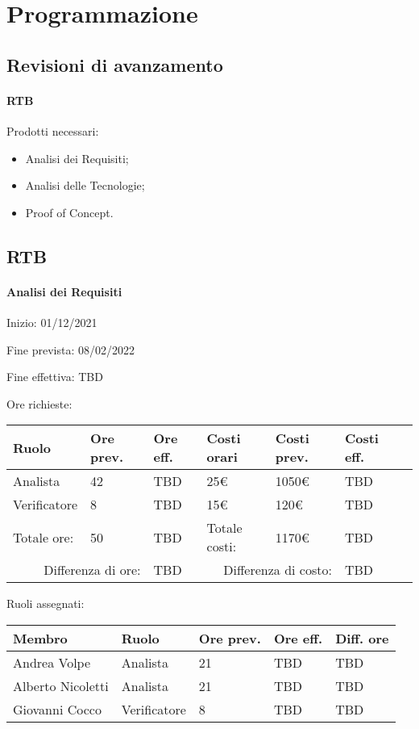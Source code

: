 \documentclass[a4paper, 12pt]{article}
\begin{document}
\makefrontpage

\makeversioni

\section{Programmazione}
\subsection{Revisioni di avanzamento}
\paragraph{RTB}
Prodotti necessari:
\begin{itemize}
\item Analisi dei Requisiti;
\item Analisi delle Tecnologie;
\item Proof of Concept.
\end{itemize}


\subsection{RTB}
\paragraph{Analisi dei Requisiti}
Inizio: 01/12/2021\par
Fine prevista: 08/02/2022\par
Fine effettiva: TBD

Ore richieste:\\[0.5em]
\begin{tabular}{|l|l|l||l|l|l|l|}\hline
Ruolo & Ore prev. & Ore eff. & Costi orari & Costi prev. & Costi eff.\\\hline
Analista & 42 & TBD & 25\euro & 1050\euro & TBD \\\hline
Verificatore & 8 & TBD & 15\euro & 120\euro & TBD \\\hline
Totale ore: & 50 & TBD & Totale costi: & 1170\euro & TBD \\\hline
\multicolumn{2}{|r|}{Differenza di ore:} & TBD & \multicolumn{2}{r|}{Differenza di costo:} & TBD \\\hline
\end{tabular}

Ruoli assegnati:\\[0.5em]
\begin{tabular}{|l|l|l|l|l|}\hline
Membro & Ruolo & Ore prev. & Ore eff. & Diff. ore \\\hline
Andrea Volpe & Analista & 21 & TBD & TBD \\\hline
Alberto Nicoletti & Analista & 21 & TBD & TBD \\\hline
Giovanni Cocco & Verificatore & 8 & TBD & TBD \\\hline
\end{tabular}
\end{document}
